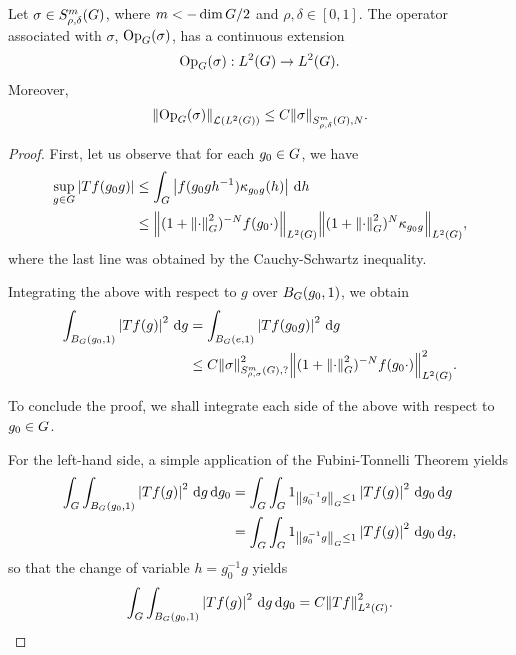 \begin{proposition}
    Let $\sigma \in \SymbolClass m {\rho, \delta}$,
    where $m < -\dim \Group / 2$ and $\rho, \delta \in [0, 1]$.
    The operator associated with $\sigma$, $\Op(\sigma)$, has a continuous extension
    \begin{align*}
        \Op(\sigma) : \Lebesgue 2 \Group \to \Lebesgue 2 \Group.
    \end{align*}
    Moreover,
    \begin{align*}
        \norm [\Lin {\Lebesgue 2 \Group}] {\Op(\sigma)}
        \leq C \SymbolSemiNorm m {\rho, \delta} N \sigma.
    \end{align*}
\end{proposition}
\begin{proof}
    First, let us observe that for each $g_0 \in \Group$, we have
    \begin{align*}
        \sup_{g \in \Group} \abs {T f(g_0 g)}
        &\leq \int_\Group \abs{f(g_0 g h^{-1}) \kappa_{g_0 g}(h)} \dd h\\
        &\leq \norm [\Lebesgue 2 \Group] {(1 + \norm [\Group] \dummy^2)^{-N} f(g_0 \dummy)} \norm [\Lebesgue 2 \Group] {(1 + \norm [\Group] \dummy^2)^N \kappa_{g_0 g}},
    \end{align*}
    where the last line was obtained by the Cauchy-Schwartz inequality.

    Integrating the above with respect to $g$ over $\Ball [\Group] {g_0} 1$,
    we obtain
    \begin{align}
        \int_{\Ball [\Group] {g_0} 1} \abs {T f(g)}^2 \dd g
        &= \int_{\Ball [\Group] e 1} \abs {T f(g_0 g)}^2 \dd g\notag\\
        &\leq C \SymbolSemiNorm m {\rho, \sigma} ? \sigma^2
        \norm [\Lebesgue 2 \Group] {(1 + \norm [\Group] \dummy^2)^{-N} f(g_0 \dummy)}^2.
        \label{eq:integral_of_Tf_on_ball_of_radius_1}
    \end{align}

    To conclude the proof,
    we shall integrate each side of the above with respect to $g_0 \in \Group$.

    For the left-hand side,
    a simple application of the Fubini-Tonnelli Theorem yields
    \begin{align*}
        \int_\Group \int_{\Ball [\Group] {g_0} 1} \abs {T f(g)}^2 \dd g \dd g_0
        &= \int_\Group \int_\Group 1_{\norm [\Group] {g_0^{-1} g} \leq 1} \abs {T f(g)}^2 \dd g_0 \dd g\\
        &= \int_\Group \int_\Group 1_{\norm [\Group] {g_0^{-1} g} \leq 1} \abs {T f(g)}^2 \dd g_0 \dd g,
    \end{align*}
    so that the change of variable $h = g_0^{-1} g$ yields
    \begin{align}
        \int_\Group \int_{\Ball [\Group] {g_0} 1} \abs {T f(g)}^2 \dd g \dd g_0
        = C \norm [\Lebesgue 2 \Group] {T f}^2.
        \label{eq:left_hand_side_of_ball_integral_for_L2_boundedness}
    \end{align}


\end{proof}
